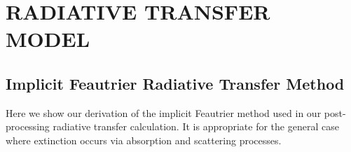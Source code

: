 \section{RADIATIVE TRANSFER MODEL} \label{apdx:RTModel}




\subsection{Implicit Feautrier Radiative Transfer Method} \label{sec:Apdx-Feautrier}



Here we show our derivation of the implicit Feautrier method used in our post-processing radiative transfer calculation. It is appropriate for the general case where extinction occurs via absorption and scattering processes.

